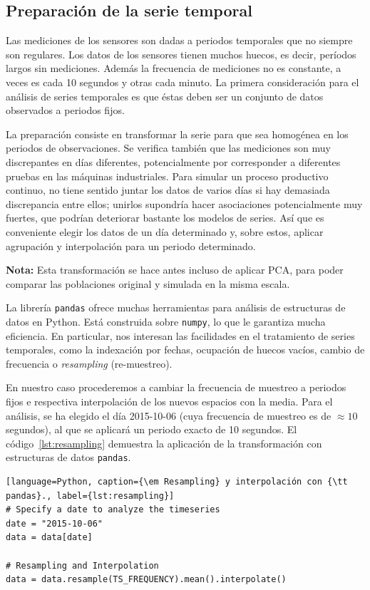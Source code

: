 \documentclass[11pt,spanish,listoffigures,listoftables]{tfgetsinf}
\begin{document}
        \subsection{Preparación de la serie temporal}
        Las mediciones de los sensores son dadas a periodos temporales que no siempre son regulares. Los datos de los sensores tienen muchos huecos, es decir, períodos largos sin mediciones. Además la frecuencia de mediciones no es constante, a veces es cada 10 segundos y otras cada minuto. La primera consideración para el análisis de series temporales es que éstas deben ser un conjunto de datos observados a periodos fijos. 
        
        La preparación consiste en transformar la serie para que sea homogénea en los periodos de observaciones. Se verifica también que las mediciones son muy discrepantes en días diferentes, potencialmente por corresponder a diferentes pruebas en las máquinas industriales. Para simular un proceso productivo continuo, no tiene sentido juntar los datos de varios días si hay demasiada discrepancia entre ellos; unirlos supondría hacer asociaciones potencialmente muy fuertes, que podrían deteriorar bastante los modelos de series. Así que es conveniente elegir los datos de un día determinado y, sobre estos, aplicar agrupación y interpolación para un periodo determinado. 
        
        {\bf Nota:} Esta transformación se hace antes incluso de aplicar PCA, para poder comparar las poblaciones original y simulada en la misma escala.
        
        La librería {\tt pandas} ofrece muchas herramientas para análisis de estructuras de datos en Python. Está construida sobre {\tt numpy}, lo que le garantiza mucha eficiencia. En particular, nos interesan las facilidades en el tratamiento de series temporales, como la indexación por fechas, ocupación de huecos vacíos, cambio de frecuencia o {\em resampling} (re-muestreo). 
        
        En nuestro caso procederemos a cambiar la frecuencia de muestreo a periodos fijos e respectiva interpolación de los nuevos espacios con la media. Para el análisis, se ha elegido el día 2015-10-06 (cuya frecuencia de muestreo es de \(\approx 10\) segundos), al que se aplicará un periodo exacto de 10 segundos. El código~\ref{lst:resampling} demuestra la aplicación de la transformación con estructuras de datos {\tt pandas}.
        
    \begin{lstlisting}[language=Python, caption={\em Resampling} y interpolación con {\tt pandas}., label={lst:resampling}]
# Specify a date to analyze the timeseries
date = "2015-10-06"
data = data[date]

# Resampling and Interpolation
data = data.resample(TS_FREQUENCY).mean().interpolate()
    \end{lstlisting}
\end{document}
